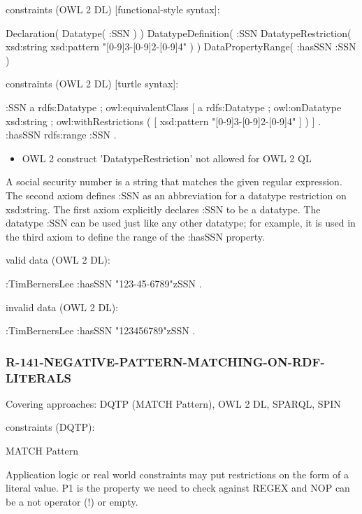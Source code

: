 \documentclass{llncs}
\begin{document}
constraints (OWL 2 DL) [functional-style syntax]:

\begin{ex}
Declaration( Datatype( :SSN ) ) 
DatatypeDefinition( 
    :SSN
    DatatypeRestriction( xsd:string xsd:pattern "[0-9]{3}-[0-9]{2}-[0-9]{4}" ) )     
DataPropertyRange( :hasSSN :SSN ) 
\end{ex}

constraints (OWL 2 DL) [turtle syntax]:

\begin{ex}
:SSN 
    a rdfs:Datatype ;
    owl:equivalentClass [
        a rdfs:Datatype ;
        owl:onDatatype xsd:string ;
        owl:withRestrictions ( 
            [ xsd:pattern "[0-9]{3}-[0-9]{2}-[0-9]{4}" ] ) ] .
:hasSSN rdfs:range :SSN .
\end{ex}

\begin{itemize}
	\item OWL 2 construct 'DatatypeRestriction' not allowed for OWL 2 QL
\end{itemize}

A social security number is a string that matches the given regular expression. 
The second axiom defines :SSN as an abbreviation for a datatype restriction on xsd:string. 
The first axiom explicitly declares :SSN to be a datatype. 
The datatype :SSN can be used just like any other datatype; 
for example, it is used in the third axiom to define the range of the :hasSSN property. 

valid data (OWL 2 DL):

\begin{ex}
:TimBernersLee
    :hasSSN "123-45-6789"^^:SSN .
\end{ex}

invalid data (OWL 2 DL):

\begin{ex}
:TimBernersLee
    :hasSSN "123456789"^^:SSN .
\end{ex}

\subsubsection{R-141-NEGATIVE-PATTERN-MATCHING-ON-RDF-LITERALS}

Covering approaches: DQTP (MATCH Pattern), OWL 2 DL, SPARQL, SPIN

constraints (DQTP):

MATCH Pattern \cite{Kontokostas2014} 

Application logic or real world constraints may put restrictions on the form of a literal value.
P1 is the property we need to check against REGEX and
NOP can be a not operator (!) or empty.
\end{document}
